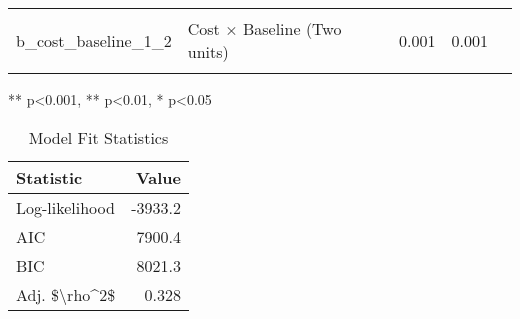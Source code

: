 \begin{table}[!h]
\begin{threeparttable}
\begin{tabular}[t]{llrrr}
\cellcolor{gray!10}{b_cost_baseline_0_1} & \cellcolor{gray!10}{Cost × Baseline (One unit)} & \cellcolor{gray!10}{0.001} & \cellcolor{gray!10}{0.001} & \cellcolor{gray!10}{}\\
\addlinespace
b_cost_baseline_1_2 & Cost × Baseline (Two units) & 0.001 & 0.001 & \\
\cellcolor{gray!10}{b_cost_baseline_2_3} & \cellcolor{gray!10}{Cost × Baseline (Three units)} & \cellcolor{gray!10}{-0.002} & \cellcolor{gray!10}{0.001} & \cellcolor{gray!10}{}\\
\bottomrule
\end{tabular}
\begin{tablenotes}
\item *** p<0.001, ** p<0.01, * p<0.05
\end{tablenotes}
\end{threeparttable}
\end{table}
\vspace{0.5cm}
\begin{table}[!h]
\centering
\caption{Model Fit Statistics}
\centering
\begin{tabular}[t]{lr}
\toprule
Statistic & Value\\
\midrule
Log-likelihood & -3933.2\\
AIC & 7900.4\\
BIC & 8021.3\\
Adj. \$\textbackslash{}rho\textasciicircum{}2\$ & 0.328\\
\bottomrule
\end{tabular}
\end{table}
